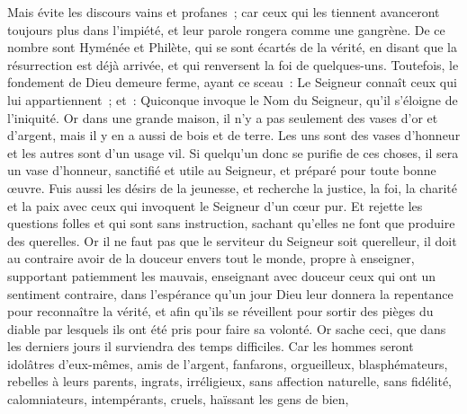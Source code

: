 \begin{multicols}{2}
Mais évite les discours vains et profanes~; car ceux qui les tiennent avanceront toujours plus dans l'impiété,
et leur parole rongera comme une gangrène. De ce nombre sont Hyménée et Philète,
qui se sont écartés de la vérité, en disant que la résurrection est déjà arrivée, et qui renversent la foi de quelques-uns.
Toutefois, le fondement de Dieu demeure ferme, ayant ce sceau~: Le Seigneur connaît ceux qui lui appartiennent~; et~: Quiconque invoque le Nom du Seigneur, qu'il s'éloigne de l'iniquité.
Or dans une grande maison, il n'y a pas seulement des vases d'or et d'argent, mais il y en a aussi de bois et de terre. Les uns sont des vases d'honneur et les autres sont d'un usage vil.
Si quelqu'un donc se purifie de ces choses, il sera un vase d'honneur, sanctifié et utile au Seigneur, et préparé pour toute bonne œuvre.
Fuis aussi les désirs de la jeunesse, et recherche la justice, la foi, la charité et la paix avec ceux qui invoquent le Seigneur d'un cœur pur.
Et rejette les questions folles et qui sont sans instruction, sachant qu'elles ne font que produire des querelles.
Or il ne faut pas que le serviteur du Seigneur soit querelleur, il doit au contraire avoir de la douceur envers tout le monde, propre à enseigner, supportant patiemment les mauvais,
enseignant avec douceur ceux qui ont un sentiment contraire, dans l'espérance qu'un jour Dieu leur donnera la repentance pour reconnaître la vérité,
et afin qu'ils se réveillent pour sortir des pièges du diable par lesquels ils ont été pris pour faire sa volonté.
\VerseOne{}Or sache ceci, que dans les derniers jours il surviendra des temps difficiles.
Car les hommes seront idolâtres d'eux-mêmes, amis de l'argent, fanfarons, orgueilleux, blasphémateurs, rebelles à leurs parents, ingrats, irréligieux,
sans affection naturelle, sans fidélité, calomniateurs, intempérants, cruels, haïssant les gens de bien,

\end{multicols}

